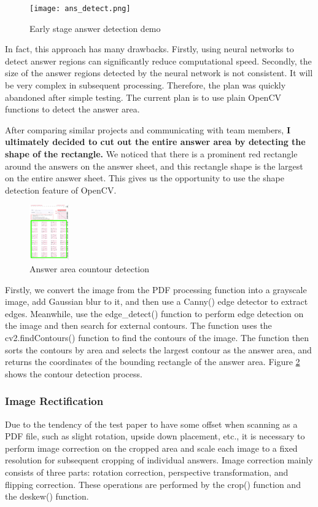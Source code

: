 \documentclass[twocolumn]{article}
\begin{document}
        \begin{figure}[ht]
            \centering
            \texttt{[image: ans\_detect.png]}
            \caption{Early stage answer detection demo}
            \label{fig:ans_detect}
        \end{figure}

        In fact, this approach has many drawbacks. Firstly, using neural networks to detect answer regions can significantly reduce computational speed. Secondly, the size of the answer regions detected by the neural network is not consistent. It will be very complex in subsequent processing. Therefore, the plan was quickly abandoned after simple testing. The current plan is to use plain OpenCV functions to detect the answer area. 

        After comparing similar projects and communicating with team members, \textbf{I ultimately decided to cut out the entire answer area by detecting the shape of the rectangle.} We noticed that there is a prominent red rectangle around the answers on the answer sheet, and this rectangle shape is the largest on the entire answer sheet. This gives us the opportunity to use the shape detection feature of OpenCV.

        \begin{figure}[ht]
            \centering
            \includegraphics[width=0.15\textwidth]{countours.jpg}
            \caption{Answer area countour detection}
            \label{fig:countours}
        \end{figure}

        Firstly, we convert the image from the PDF processing function into a grayscale image, add Gaussian blur to it, and then use a Canny() edge detector to extract edges. Meanwhile, use the edge\_detect() function to perform edge detection on the image and then search for external contours. The function uses the cv2.findContours() function to find the contours of the image. The function then sorts the contours by area and selects the largest contour as the answer area, and returns the coordinates of the bounding rectangle of the answer area. Figure \ref{fig:countours} shows the contour detection process.

        
        \subsubsection{Image Rectification}
        Due to the tendency of the test paper to have some offset when scanning as a PDF file, such as slight rotation, upside down placement, etc., it is necessary to perform image correction on the cropped area and scale each image to a fixed resolution for subsequent cropping of individual answers. Image correction mainly consists of three parts: rotation correction, perspective transformation, and flipping correction. These operations are performed by the crop() function and the deskew() function.
\end{document}
